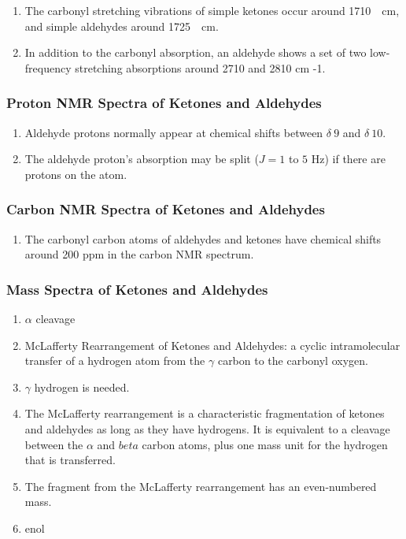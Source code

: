 \begin{enumerate}
    \item The carbonyl  stretching vibrations of simple ketones occur around \qty{1710}{\per \centi \meter}, and simple aldehydes around \qty{1725}{\per \centi \meter}.
    \item In addition to the carbonyl absorption, an aldehyde shows a set of two low-frequency stretching absorptions around 2710  and 2810 cm -1.
\end{enumerate}

\subsubsection{Proton NMR Spectra of Ketones and Aldehydes}

\begin{enumerate}
    \item Aldehyde protons normally appear at chemical shifts between $ \delta \ 9 $ and $ \delta \ 10 $.
    \item The aldehyde proton’s absorption may be split ($ J = 1 $ to $ 5 $ \si{Hz}) if there are protons on the atom.
\end{enumerate}
\subsubsection{Carbon NMR Spectra of Ketones and Aldehydes}

\begin{enumerate}
    \item The carbonyl carbon atoms of aldehydes and ketones have chemical shifts around 200 ppm in the carbon NMR spectrum.
\end{enumerate}

\subsubsection{Mass Spectra of Ketones and Aldehydes}

\begin{enumerate}
    \item $ \alpha $ cleavage %
    \item McLafferty Rearrangement of Ketones and Aldehydes: a cyclic intramolecular transfer of a hydrogen atom from the $ \gamma $ carbon to the carbonyl oxygen.
    \item $ \gamma $ hydrogen is needed. %
    \item The McLafferty rearrangement is a characteristic fragmentation of ketones and aldehydes as long as they have hydrogens. It is equivalent to a cleavage between the $ \alpha $ and $ beta $ carbon atoms, plus one mass unit for the hydrogen that is transferred.
    \item The fragment from the McLafferty rearrangement has an even-numbered mass.
    \item enol
\end{enumerate}

